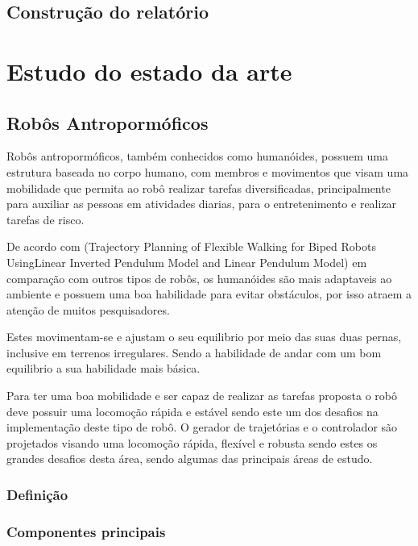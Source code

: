\section{Construção do relatório}
\label{sec:const}


\chapter{Estudo do estado da arte}
\label{chap:sota}

\section{Robôs Antropormóficos}
\label{ssec:robos}

Robôs antropormóficos, também conhecidos como humanóides, possuem uma estrutura baseada no corpo humano, com  membros e movimentos que visam uma mobilidade que permita ao robô realizar tarefas diversificadas, principalmente para auxiliar as pessoas em atividades diarias, para o entretenimento e realizar tarefas de risco.

De acordo com (Trajectory Planning of Flexible Walking for Biped Robots UsingLinear Inverted Pendulum Model and Linear Pendulum Model) em comparação com outros tipos de robôs, os humanóides são mais adaptaveis ao ambiente e possuem uma boa habilidade para evitar obstáculos, por isso atraem a atenção de muitos pesquisadores.

Estes movimentam-se e ajustam o seu equilibrio por meio das suas duas pernas, inclusive em terrenos irregulares. Sendo a habilidade de andar com um bom equilibrio a sua habilidade mais básica.

Para ter uma boa mobilidade e ser capaz de realizar as tarefas proposta o robô deve possuir uma locomoção rápida e estável sendo este um dos desafios na implementação deste tipo de robô. O gerador de trajetórias e o controlador são projetados visando uma locomoção rápida, flexível e robusta sendo estes os grandes desafios desta área, sendo algumas das principais áreas de estudo.

\subsection{Definição}
\label{ssec:defi}

\subsection{Componentes principais}
\label{ssec:comp}

